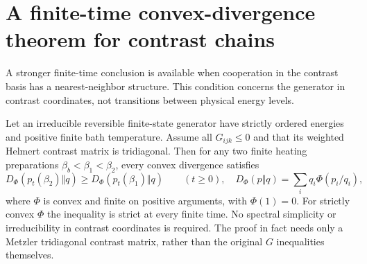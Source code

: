 \section{A finite-time convex-divergence theorem for contrast chains}
\label{sec:contrastchainentropy}
A stronger finite-time conclusion is available when cooperation in the
contrast basis has a nearest-neighbor structure. This condition concerns
the generator in contrast coordinates, not transitions between physical
energy levels.

\begin{theorem}
\label{thm:contrastchainentropy}
Let an irreducible reversible finite-state generator have strictly ordered
energies and positive finite bath temperature. Assume all $G_{ijk}\leq0$
and that its weighted Helmert contrast matrix is tridiagonal. Then for
any two finite heating preparations
$\beta_b<\beta_1<\beta_2$, every convex divergence satisfies
\[
D_\Phi(p_t(\beta_2)\Vert q)
\geq D_\Phi(p_t(\beta_1)\Vert q)
\qquad(t\geq0),
\quad
D_\Phi(p\Vert q)=\sum_iq_i\Phi(p_i/q_i),
\]
where $\Phi$ is convex and finite on positive arguments, with $\Phi(1)=0$.
For strictly convex $\Phi$ the inequality is strict at every finite time.
No spectral simplicity or irreducibility in contrast coordinates is
required. The proof in fact needs only a Metzler tridiagonal contrast
matrix, rather than the original $G$ inequalities themselves.
\end{theorem}
